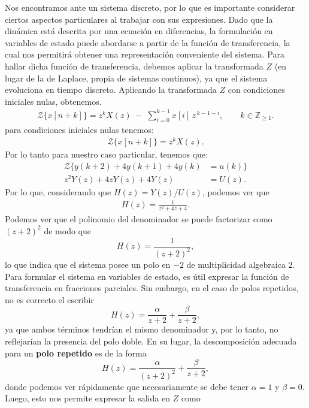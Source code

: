 \documentclass[
  11pt,
  letterpaper,
   addpoints,
  answers
  ]{exam}
\begin{document}
\begin{questions}
\begin{solution}
Nos encontramos ante un sistema discreto, por lo que es importante considerar ciertos aspectos particulares al trabajar con sus expresiones. Dado que la dinámica está descrita por una ecuación en diferencias, la formulación en variables de estado puede abordarse a partir de la función de transferencia, la cual nos permitirá obtener una representación conveniente del sistema. Para hallar dicha función de transferencia, debemos aplicar la transformada $Z$ (en lugar de la de Laplace, propia de sistemas continuos), ya que el sistema evoluciona en tiempo discreto. Aplicando la transformada $Z$ con condiciones iniciales nulas, obtenemos.
\begin{align}
  \mathcal{Z}\{x[n+k]\}
= z^{k} X(z) \;-\; \sum_{i=0}^{k-1} x[i]\, z^{\,k-1-i},
\qquad k\in \mathbb{Z}_{\ge 1}.
\end{align}
para condiciones iniciales nulas tenemos:
\begin{align}
  \mathcal{Z}\{x[n+k]\}
= z^{k} X(z).
\end{align}
Por lo tanto para nuestro caso particular, tenemos que:
\begin{align}
  \mathcal{Z}\{y(k+2) + 4y(k+1) + 4y(k) &= u(k)\} \\
z^{2}Y(z)+4zY(z)+4Y(z)&=U(z).
\end{align}
Por lo que, considerando que $H(z)=Y(z)/U(z)$, podemos ver que
\begin{align}
H(z)=\frac{1}{z^{2}+4z+4}.
\end{align}
Podemos ver que el polinomio del denominador se puede factorizar como $(z+2)^{2}$ de modo que
\begin{equation}
H(z)=\frac{1}{(z+2)^{2}},
\end{equation}
lo que indica que el sistema posee un polo en $-2$ de multiplicidad algebraica $2$. Para formular el sistema en variables de estado, es útil expresar la función de transferencia en fracciones parciales. Sin embargo, en el caso de polos repetidos, no es correcto el escribir
\begin{equation}
H(z)=\frac{\alpha}{z+2}+\frac{\beta}{z+2},
\end{equation}
ya que ambos términos tendrían el mismo denominador y, por lo tanto, no reflejarían la presencia del polo doble. En su lugar, la descomposición adecuada para un \textbf{polo repetido} es de la forma
\begin{equation}
H(z)=\frac{\alpha}{(z+2)^{2}}+\frac{\beta}{z+2},
\end{equation}
donde podemos ver rápidamente que necesariamente se debe tener $\alpha=1$ y $\beta=0$. Luego, esto nos permite expresar la salida en $Z$ como

\end{solution}
\end{questions}
\end{document}
